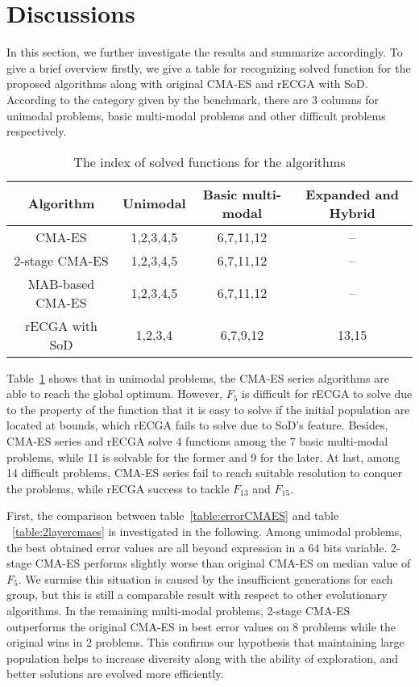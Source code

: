\section{Discussions}
  \label{sec:discussion}

In this section, we further investigate the results and summarize
accordingly.
To give a brief overview firstly, we give a table for recognizing solved
function for the proposed algorithms along with original CMA-ES and
rECGA with SoD.
According to the category given by the benchmark, there are 3 columns
for unimodal problems, basic multi-modal problems and other difficult
problems respectively.

\begin{table}
\centering  
\begin{tabular}{cccc}
Algorithm & Unimodal & Basic multi-modal & Expanded and Hybrid \\\hline  
CMA-ES   & 1,2,3,4,5 & 6,7,11,12 & -- \\
2-stage CMA-ES & 1,2,3,4,5 & 6,7,11,12 & -- \\
MAB-based CMA-ES & 1,2,3,4,5 & 6,7,11,12 & -- \\
rECGA with SoD & 1,2,3,4 & 6,7,9,12 &13,15 \\\hline
\end{tabular}
  \caption{The index of solved functions for the algorithms}
  \label{table:solved}

\end{table}

Table~\ref{table:solved} shows that in unimodal problems, the CMA-ES series algorithms
are able to reach the global optimum.
However, $F_5$ is difficult for rECGA to solve due to the property of
the function that it is easy to solve if the initial population are
located at bounds, which rECGA fails to solve due to SoD's feature.
Besides, CMA-ES series and rECGA solve 4 functions among the 7 basic
multi-modal problems, while 11 is solvable for the former and 9 for the
later.
At last, among 14 difficult problems, CMA-ES series fail to reach
suitable resolution to conquer the problems, while rECGA success to
tackle $F_{13}$ and $F_{15}$.

First, the comparison between table~\ref{table:errorCMAES} and table
~\ref{table:2layercmaes} is investigated in the following.
Among unimodal problems, the best obtained error values are all beyond
expression in a 64 bits variable. 2-stage CMA-ES performs slightly worse
than original CMA-ES on median value of $F_5$.
We surmise this situation is caused by the insufficient generations for
each group, but this is still a comparable result with respect to other
evolutionary algorithms.
In the remaining multi-modal problems, 2-stage CMA-ES outperforms the original
CMA-ES in best error values on 8 problems while the original
wins in 2 problems.
This confirms our hypothesis that maintaining large population helps to
increase diversity along with the ability of exploration, and better
solutions are evolved more efficiently.

